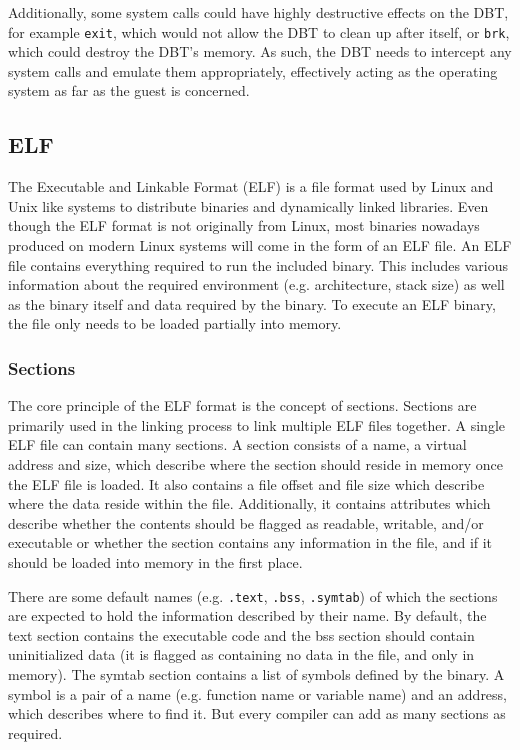 		Additionally, some system calls could have highly destructive effects on the DBT, for example \texttt{exit}, which would not allow the DBT to clean up after itself, or \texttt{brk}, which could destroy the DBT's memory. As such, the DBT needs to intercept any system calls and emulate them appropriately, effectively acting as the operating system as far as the guest is concerned.
	
\subsection{ELF}
	The Executable and Linkable Format (ELF) is a file format used by Linux and Unix like systems to distribute binaries and dynamically linked libraries. Even though the ELF format is not originally from Linux, most binaries nowadays produced on modern Linux systems will come in the form of an ELF file. An ELF file contains everything required to run the included binary. This includes various information about the required environment (e.g. architecture, stack size) as well as the binary itself and data required by the binary. To execute an ELF binary, the file only needs to be loaded partially into memory. 
	
	\subsubsection{Sections} 
	The core principle of the ELF format is the concept of sections. Sections are primarily used in the linking process to link multiple ELF files together. A single ELF file can contain many sections. A section consists of a name, a virtual address and size, which describe where the section should reside in memory once the ELF file is loaded. It also contains a file offset and file size which describe where the data reside within the file. Additionally, it contains attributes which describe whether the contents should be flagged as readable, writable, and/or executable or whether the section contains any information in the file, and if it should be loaded into memory in the first place.
	
	There are some default names (e.g. \texttt{.text}, \texttt{.bss}, \texttt{.symtab}) of which the sections are expected to hold the information described by their name. By default, the text section contains the executable code and the bss section should contain uninitialized data (it is flagged as containing no data in the file, and only in memory). The symtab section contains a list of symbols defined by the binary. A symbol is a pair of a name (e.g. function name or variable name) and an address, which describes where to find it. But every compiler can add as many sections as required.
	
